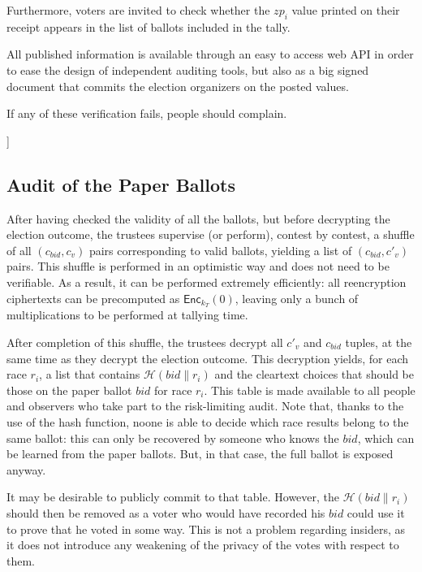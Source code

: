 \documentclass[prodmode]{acmsmall}
\newcommand{\COP}[1]{{\sf [[OP: #1]]}}
\newcommand{\kt}{\ensuremath{k_T}\xspace}
\newcommand{\zp}{\ensuremath{zp}\xspace}
\newcommand{\bid}{\ensuremath{bid}\xspace}   %
\newcommand{\Enc}[2]{\textsf{Enc}_{#1}(#2)\xspace} %
\newcommand{\hash}{\ensuremath{\mathcal{H}}\xspace} %
\newcommand{\cv}{\ensuremath{c_v}\xspace} %
\newcommand{\cpv}{\ensuremath{c'_v}\xspace} %
\newcommand{\cb}{\ensuremath{c_{\bid}}\xspace} %
\newcommand{\cpb}{\ensuremath{c_{\bid}}\xspace} %
\begin{document}
Furthermore, voters are invited to check whether the $\zp_i$ value
printed on their receipt appears in the list of ballots included in
the tally. 

All published information is available through an easy to access web
API in order to ease the design of independent auditing tools, but
also as a big signed document that commits the election organizers on
the posted values.

If any of these verification fails, people should complain.

\COP{Discuss how to deal with these complains. }

\subsection{Audit of the Paper Ballots}
\label{sec:risk-limiting-audit}

After having checked the validity of all the ballots, but before
decrypting the election outcome, the trustees supervise (or perform),
contest by contest, a shuffle of all $(\cb, \cv)$ pairs corresponding
to valid ballots, yielding a list of $(\cpb, \cpv)$ pairs. This
shuffle is performed in an optimistic way and does not need to be
verifiable. As a result, it can be performed extremely efficiently:
all reencryption ciphertexts can be precomputed as $\Enc{\kt}{0}$,
leaving only a bunch of multiplications to be performed at tallying
time.

After completion of this shuffle, the trustees decrypt all \cpv and
$\cpb$ tuples, at the same time as they decrypt the election
outcome. This decryption yields, for each race $r_i$, a list that
contains $\hash(bid\|r_i)$ and the cleartext choices that should be
those on the paper ballot $\bid$ for race $r_i$. This table is made
available to all people and observers who take part to the
risk-limiting audit. Note that, thanks to the use of the hash
function, noone is able to decide which race results belong to the
same ballot: this can only be recovered by someone who knows the \bid,
which can be learned from the paper ballots. But, in that case, the
full ballot is exposed anyway.

It may be desirable to publicly commit to that table. However, the
$\hash(bid\|r_i)$ should then be removed as a voter who would have
recorded his \bid could use it to prove that he voted in some
way. This is not a problem regarding insiders, as it does not
introduce any weakening of the privacy of the votes with respect to
them.
\end{document}
